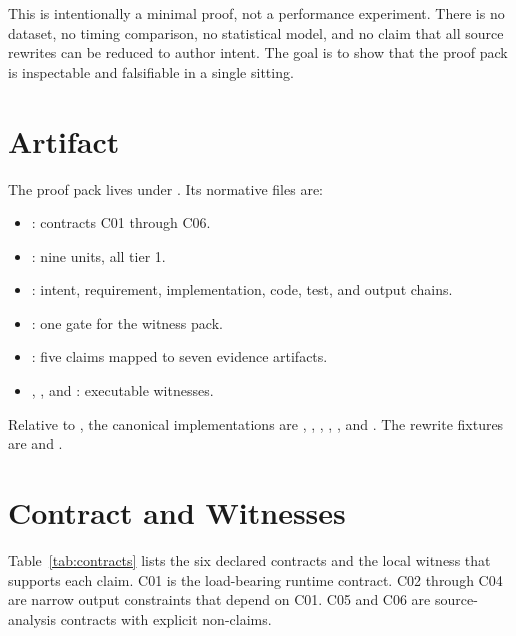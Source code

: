 \documentclass[11pt,letterpaper]{article}
\begin{document}
This is intentionally a minimal proof, not a performance experiment.
There is no dataset, no timing comparison, no statistical model, and no
claim that all source rewrites can be reduced to author intent. The
goal is to show that the proof pack is inspectable and falsifiable in a
single sitting.

\section{Artifact}

The proof pack lives under . Its
normative files are:

\begin{itemize}
  \item {}: contracts C01 through C06.
  \item {}: nine units, all tier 1.
  \item {}: intent, requirement, implementation,
        code, test, and output chains.
  \item {}: one gate for the witness pack.
  \item {}: five claims mapped to seven
        evidence artifacts.
  \item {}, , and
        : executable witnesses.
\end{itemize}

Relative to , the canonical
implementations are ,
, ,
, , and
. The rewrite fixtures are
 and
.

\section{Contract and Witnesses}

Table~\ref{tab:contracts} lists the six declared contracts and the
local witness that supports each claim. C01 is the load-bearing runtime
contract. C02 through C04 are narrow output constraints that depend on
C01. C05 and C06 are source-analysis contracts with explicit
non-claims.
\end{document}
